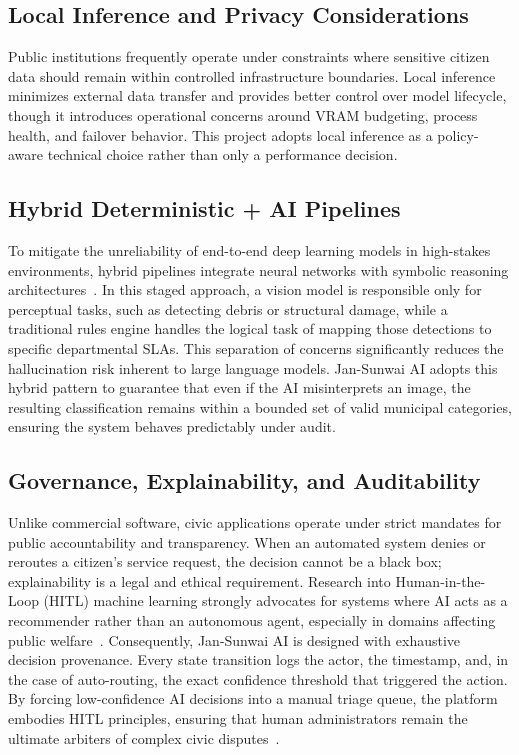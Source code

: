 \subsection{Local Inference and Privacy Considerations}

Public institutions frequently operate under constraints where sensitive citizen data should remain within controlled infrastructure boundaries. Local inference minimizes external data transfer and provides better control over model lifecycle, though it introduces operational concerns around VRAM budgeting, process health, and failover behavior. This project adopts local inference as a policy-aware technical choice rather than only a performance decision.

\subsection{Hybrid Deterministic + AI Pipelines}

To mitigate the unreliability of end-to-end deep learning models in high-stakes environments, hybrid pipelines integrate neural networks with symbolic reasoning architectures~\cite{neuro_symbolic}. In this staged approach, a vision model is responsible only for perceptual tasks, such as detecting debris or structural damage, while a traditional rules engine handles the logical task of mapping those detections to specific departmental SLAs. This separation of concerns significantly reduces the hallucination risk inherent to large language models. Jan-Sunwai AI adopts this hybrid pattern to guarantee that even if the AI misinterprets an image, the resulting classification remains within a bounded set of valid municipal categories, ensuring the system behaves predictably under audit.

\subsection{Governance, Explainability, and Auditability}

Unlike commercial software, civic applications operate under strict mandates for public accountability and transparency. When an automated system denies or reroutes a citizen's service request, the decision cannot be a black box; explainability is a legal and ethical requirement. Research into Human-in-the-Loop (HITL) machine learning strongly advocates for systems where AI acts as a recommender rather than an autonomous agent, especially in domains affecting public welfare~\cite{hitl_ai}. Consequently, Jan-Sunwai AI is designed with exhaustive decision provenance. Every state transition logs the actor, the timestamp, and, in the case of auto-routing, the exact confidence threshold that triggered the action. By forcing low-confidence AI decisions into a manual triage queue, the platform embodies HITL principles, ensuring that human administrators remain the ultimate arbiters of complex civic disputes~\cite{un_e_gov, neuro_symbolic}.

